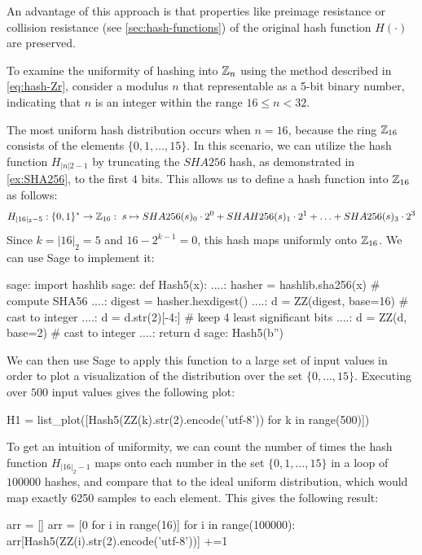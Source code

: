 An advantage of this approach is that properties like preimage resistance or collision resistance (see \secname{} \ref{sec:hash-functions}) of the original hash function $H(\cdot)$ are preserved.
\begin{example} To examine the uniformity of hashing into $\mathbb{Z}_n$ using the method described in \ref{eq:hash-Zr}, consider a modulus $n$ that representable as a 5-bit binary number, indicating that $n$ is an integer within the range $16 \leq n < 32$.

The most uniform hash distribution occurs when $n = 16$, because the ring $\mathbb{Z}_{16}$ consists of the elements $\{0, 1, \ldots, 15\}$. In this scenario, we can utilize the hash function $H_{|n|2-1}$ by truncating the $SHA256$ hash, as demonstrated in \examplename{} \ref{ex:SHA256}, to the first $4$ bits. This allows us to define a hash function into $\mathbb{Z}_{16}$ as follows:
$$
H_{|16|_2-5}: \{0,1\}^* \to \mathbb{Z}_{16}:\; s\mapsto
SHA256(s)_0\cdot 2^0 + SHAH256(s)_1\cdot 2^1 + \ldots + SHA256(s)_3\cdot 2^3
$$
Since $k=|16|_2=5$ and $16-2^{k-1}=0$, this hash maps uniformly onto $\mathbb{Z}_{16}$. We can use Sage to implement it:
\begin{sagecommandline}
sage: import hashlib
sage: def Hash5(x):
....:     hasher = hashlib.sha256(x) # compute SHA56
....:     digest = hasher.hexdigest()
....:     d = ZZ(digest, base=16) # cast to integer
....:     d = d.str(2)[-4:] # keep 4 least significant bits
....:     d = ZZ(d, base=2) # cast to integer
....:     return d
sage: Hash5(b'')
\end{sagecommandline}
We can then use Sage to apply this function to a large set of input values in order to plot a visualization of the distribution over the set $\{0,\ldots,15\}$. Executing over $500$ input values gives the following plot:
\begin{sagesilent}
H1 = list_plot([Hash5(ZZ(k).str(2).encode('utf-8')) for k in range(500)])
\end{sagesilent}
\begin{center}
\end{center}
To get an intuition of uniformity, we can count the number of times the hash function $H_{|16|_2-1}$ maps onto each number in the set $\{0,1,\ldots,15\}$ in a loop of $100000$ hashes, and compare that to the ideal uniform distribution, which would map exactly 6250 samples to each element. This gives the following result:
\begin{sagesilent}
arr = []
arr = [0 for i in range(16)]
for i in range(100000):
    arr[Hash5(ZZ(i).str(2).encode('utf-8'))] +=1

\end{sagesilent}
\end{example}
